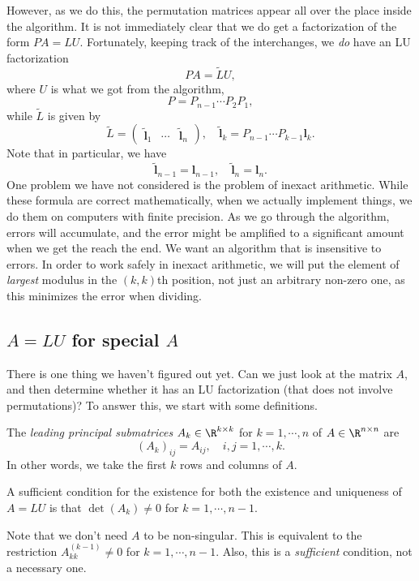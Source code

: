 \documentclass[a4paper]{article}
\begin{document}
However, as we do this, the permutation matrices appear all over the place inside the algorithm. It is not immediately clear that we do get a factorization of the form $PA = LU$. Fortunately, keeping track of the interchanges, we \emph{do} have an LU factorization
\[
  PA = \tilde{L}U,
\]
where $U$ is what we got from the algorithm,
\[
  P = P_{n - 1} \cdots P_2 P_1,
\]
while $\tilde{L}$ is given by
\[
  \tilde{L} =
  \begin{pmatrix}
    \tilde{\mathbf{l}}_1 & \cdots & \tilde{\mathbf{l}}_n
  \end{pmatrix},
  \quad \tilde{\mathbf{l}}_k = P_{n - 1} \cdots P_{k - 1} \mathbf{l}_k.
\]
Note that in particular, we have
\[
  \tilde{\mathbf{l}}_{n - 1} = \mathbf{l}_{n - 1},\quad \tilde{\mathbf{l}}_n = \mathbf{l}_n.
\]
One problem we have not considered is the problem of inexact arithmetic. While these formula are correct mathematically, when we actually implement things, we do them on computers with finite precision. As we go through the algorithm, errors will accumulate, and the error might be amplified to a significant amount when we get the reach the end. We want an algorithm that is insensitive to errors. In order to work safely in inexact arithmetic, we will put the element of \emph{largest} modulus in the $(k, k)$th position, not just an arbitrary non-zero one, as this minimizes the error when dividing.

\subsection{\texorpdfstring{$A = LU$}{A = LU} for special \texorpdfstring{$A$}{A}}
There is one thing we haven't figured out yet. Can we just look at the matrix $A$, and then determine whether it has an LU factorization (that does not involve permutations)? To answer this, we start with some definitions.

\begin{defi}
  The \emph{leading principal submatrices} $A_k \in \R^{k \times k}$ for $k = 1, \cdots, n$ of $A \in \R^{n \times n}$ are
  \[
    (A_k)_{ij} = A_{ij},\quad i, j = 1, \cdots, k.
  \]
  In other words, we take the first $k$ rows and columns of $A$.
\end{defi}

\begin{thm}
  A sufficient condition for the existence for both the existence and uniqueness of $A = LU$ is that $\det(A_{k}) \not= 0$ for $k = 1, \cdots, n - 1$.
\end{thm}
Note that we don't need $A$ to be non-singular. This is equivalent to the restriction $A_{kk}^{(k - 1)} \not= 0$ for $k = 1, \cdots, n - 1$. Also, this is a \emph{sufficient} condition, not a necessary one.
\end{document}
